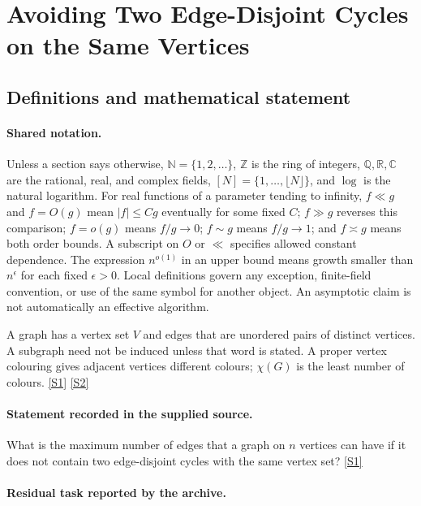 \documentclass[11pt,a4paper]{article}
\newcommand{\N}{\mathbb{N}}
\newcommand{\Z}{\mathbb{Z}}
\newcommand{\Q}{\mathbb{Q}}
\newcommand{\R}{\mathbb{R}}
\newcommand{\C}{\mathbb{C}}
\newcommand{\sref}[2]{\hyperlink{source:#1:#2}{[S#2]}}
\begin{document}
\section{Avoiding Two Edge-Disjoint Cycles on the Same Vertices}\label{statement}


\subsection{Definitions and mathematical statement}

\paragraph{Shared notation.}Unless a section says otherwise, $\N=\{1,2,\ldots\}$,
$\Z$ is the ring of integers, $\Q,\R,\C$ are the rational, real, and complex
fields, $[N]=\{1,\ldots,\lfloor N\rfloor\}$, and $\log$ is the natural
logarithm. For real functions of a parameter tending to infinity,
$f\ll g$ and $f=O(g)$ mean $|f|\leq Cg$ eventually for some fixed $C$;
$f\gg g$ reverses this comparison; $f=o(g)$ means $f/g\to0$;
$f\sim g$ means $f/g\to1$; and $f\asymp g$ means both order bounds.
A subscript on $O$ or $\ll$ specifies allowed constant dependence.
The expression $n^{o(1)}$ in an upper bound means growth smaller than
$n^\epsilon$ for each fixed $\epsilon>0$. Local definitions govern any
exception, finite-field convention, or use of the same symbol for another
object. An asymptotic claim is not automatically an effective algorithm.



A graph has a vertex set $V$ and edges that are unordered pairs of distinct vertices. A subgraph need not be induced unless that word is stated. A proper vertex colouring gives adjacent vertices different colours; $\chi(G)$ is the least number of colours. \sref{statement}{1} \sref{statement}{2}

\paragraph{Statement recorded in the supplied source.}
What is the maximum number of edges that a graph on $n$ vertices can have if it does not contain two edge-disjoint cycles with the same vertex set? \sref{statement}{1}

\paragraph{Residual task reported by the archive.}
\end{document}
